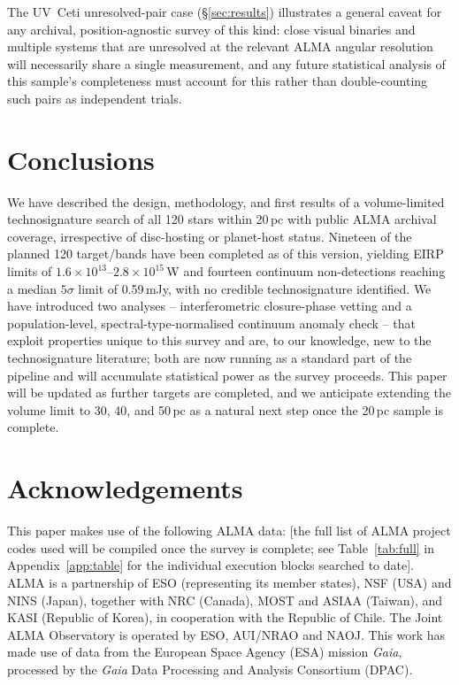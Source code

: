 \documentclass{openjournal}
\begin{document}
The UV~Ceti unresolved-pair case (\S\ref{sec:results}) illustrates a
general caveat for any archival, position-agnostic survey of this kind:
close visual binaries and multiple systems that are unresolved at the
relevant ALMA angular resolution will necessarily share a single
measurement, and any future statistical analysis of this sample's
completeness must account for this rather than double-counting such
pairs as independent trials.

\section{Conclusions}
\label{sec:conclusions}

We have described the design, methodology, and first results of a
volume-limited technosignature search of all 120 stars within 20\,pc
with public ALMA archival coverage, irrespective of disc-hosting or
planet-host status. Nineteen of the planned 120 target/bands have been
completed as of this version, yielding EIRP limits of
$1.6\times10^{13}$--$2.8\times10^{15}$\,W and fourteen continuum
non-detections reaching a median $5\sigma$ limit of 0.59\,mJy, with no
credible technosignature identified. We have introduced two analyses
-- interferometric closure-phase vetting and a population-level,
spectral-type-normalised continuum anomaly check -- that exploit
properties unique to this survey and are, to our knowledge, new to the
technosignature literature; both are now running as a standard part of
the pipeline and will accumulate statistical power as the survey
proceeds. This paper will be updated as further targets are completed,
and we anticipate extending the volume limit to 30, 40, and 50\,pc as a
natural next step once the 20\,pc sample is complete.

\section*{Acknowledgements}
This paper makes use of the following ALMA data: [the full list of ALMA
project codes used will be compiled once the survey is complete; see
Table~\ref{tab:full} in Appendix~\ref{app:table} for the individual
execution blocks searched to date]. ALMA is a partnership of ESO
(representing its member states), NSF (USA) and NINS (Japan), together with NRC
(Canada), MOST and ASIAA (Taiwan), and KASI (Republic of Korea), in cooperation
with the Republic of Chile. The Joint ALMA Observatory is operated by ESO,
AUI/NRAO and NAOJ. This work has made use of data from the European Space
Agency (ESA) mission {\it Gaia}, processed by the {\it Gaia} Data Processing and
Analysis Consortium (DPAC).
\end{document}
